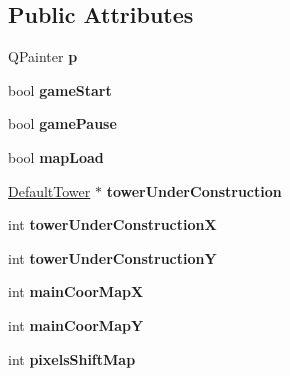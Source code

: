 \subsection*{Public Attributes}
\begin{DoxyCompactItemize}
\item 
\hypertarget{class_game_widget_a55e688bb11866891cdc3f0ea294cc4f1}{}Q\+Painter {\bfseries p}\label{class_game_widget_a55e688bb11866891cdc3f0ea294cc4f1}

\item 
\hypertarget{class_game_widget_a6894b8be19bea8a2ff5075cea6dcbc10}{}bool {\bfseries game\+Start}\label{class_game_widget_a6894b8be19bea8a2ff5075cea6dcbc10}

\item 
\hypertarget{class_game_widget_a9e63f4b46233427e1f562a475b03a72a}{}bool {\bfseries game\+Pause}\label{class_game_widget_a9e63f4b46233427e1f562a475b03a72a}

\item 
\hypertarget{class_game_widget_a1ab82b763e6e84703b070428a3612060}{}bool {\bfseries map\+Load}\label{class_game_widget_a1ab82b763e6e84703b070428a3612060}

\item 
\hypertarget{class_game_widget_a5fc54b0d8dfbaffe8a5a6d0fd02cee00}{}\hyperlink{class_default_tower}{Default\+Tower} $\ast$ {\bfseries tower\+Under\+Construction}\label{class_game_widget_a5fc54b0d8dfbaffe8a5a6d0fd02cee00}

\item 
\hypertarget{class_game_widget_a1ab6561ce93b78226eee7361edf6b195}{}int {\bfseries tower\+Under\+Construction\+X}\label{class_game_widget_a1ab6561ce93b78226eee7361edf6b195}

\item 
\hypertarget{class_game_widget_ae05563c3f687ff22f71d0a3594337b52}{}int {\bfseries tower\+Under\+Construction\+Y}\label{class_game_widget_ae05563c3f687ff22f71d0a3594337b52}

\item 
\hypertarget{class_game_widget_a4770050f068f8d2ec2f41a3eba8140be}{}int {\bfseries main\+Coor\+Map\+X}\label{class_game_widget_a4770050f068f8d2ec2f41a3eba8140be}

\item 
\hypertarget{class_game_widget_ab8d323eb270a56e43b972dcd6d23ae6d}{}int {\bfseries main\+Coor\+Map\+Y}\label{class_game_widget_ab8d323eb270a56e43b972dcd6d23ae6d}

\item 
\hypertarget{class_game_widget_a9c33edc2554e5221fa6a451e1977a663}{}int {\bfseries pixels\+Shift\+Map}\label{class_game_widget_a9c33edc2554e5221fa6a451e1977a663}


\end{DoxyCompactItemize}
